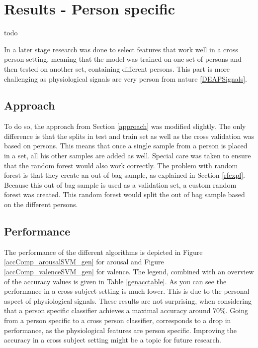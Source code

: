 \chapter{Results - Person specific}
{\samenvatting todo}

In a later stage research was done to select features that work well in a cross person setting, meaning that the model was trained on one set of persons and then tested on another set, containing different persons. This part is more challenging as physiological signals are very person from nature \ref{DEAPSignals}.

\section{Approach}

To do so, the approach from Section \ref{approach} was modified slightly. The only difference is that the splits in test and train set as well as the cross validation was based on persons. This means that once a single sample from a person is placed in a set, all his other samples are added as well. Special care was taken to ensure that the random forest would also work correctly. The problem with random forest is that they create an out of bag sample, as explained in Section \ref{rfexpl}. Because this out of bag sample is used as a validation set, a custom random forest was created. This random forest would split the out of bag sample based on the different persons.

\section{Performance}
The performance of the different algorithms is depicted in Figure \ref{accComp_arousalSVM_gen} for arousal and Figure \ref{accComp_valenceSVM_gen} for valence. The legend, combined with an overview of the accuracy values is given in Table \ref{genacctable}. As you can see the performance in a cross subject setting is much lower. This is due to the personal aspect of physiological signals. These results are not surprising, when considering that a person specific classifier achieves a maximal accuracy around 70\%. Going from a person specific to a cross person classifier, corresponds to a drop in performance, as the physiological features are person specific. Improving the accuracy in a cross subject setting might be a topic for future research. 

